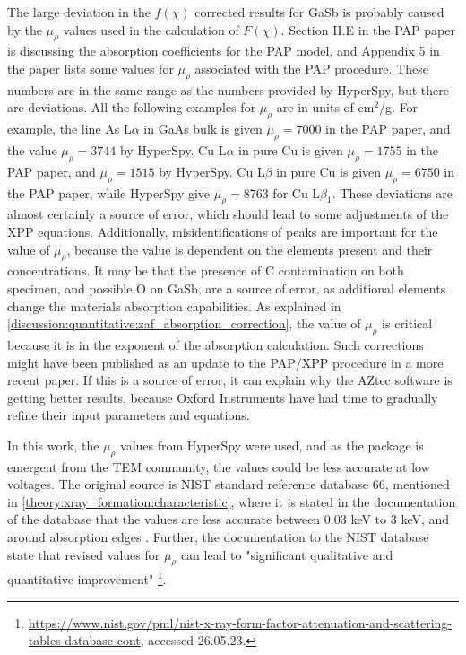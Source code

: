
The large deviation in the $f(\chi)$ corrected results for GaSb is probably caused by the $\mu_\rho$ values used in the calculation of $F(\chi)$.
Section II.E in the PAP paper is discussing the absorption coefficients for the PAP model, and Appendix 5 \cite[p. 63]{pap_1991} in the paper lists some values for $\mu_\rho$ associated with the PAP procedure.
These numbers are in the same range as the numbers provided by HyperSpy, but there are deviations.
All the following examples for $\mu_\rho$ are in units of cm$^2$/g.
For example, the line As L$\alpha$ in GaAs bulk is given $\mu_\rho = 7000$ in the PAP paper, and the value $\mu_\rho = 3744$ by HyperSpy.
Cu L$\alpha$ in pure Cu is given $\mu_\rho = 1755$ in the PAP paper, and $\mu_\rho = 1515$ by HyperSpy.
Cu L$\beta$ in pure Cu is given $\mu_\rho = 6750$ in the PAP paper, while HyperSpy give $\mu_\rho = 8763$ for Cu L$\beta_1$.
These deviations are almost certainly a source of error, which should lead to some adjustments of the XPP equations.
Additionally, misidentifications of peaks are important for the value of  $\mu_\rho$, because the value is dependent on the elements present and their concentrations.
It may be that the presence of C contamination on both specimen, and possible O on GaSb, are a source of error, as additional elements change the materials absorption capabilities.
As explained in \cref{discussion:quantitative:zaf_absorption_correction}, the value of $\mu_\rho$ is critical because it is in the exponent of the absorption calculation.
Such corrections might have been published as an update to the PAP/XPP procedure in a more recent paper.
If this is a source of error, it can explain why the AZtec software is getting better results, because Oxford Instruments have had time to gradually refine their input parameters and equations.


In this work, the $\mu_\rho$ values from HyperSpy were used, and as the package is emergent from the TEM community, the values could be less accurate at low voltages.
The original source is NIST standard reference database 66, mentioned in \cref{theory:xray_formation:characteristic}, where it is stated in the documentation of the database that the values are less accurate between $0.03$ keV to $3$ keV, and around absorption edges \cite{nist_xraydatabase_hyperspy}.
Further, the documentation to the NIST database state that revised values for $\mu_\rho$ can lead to "significant qualitative and quantitative improvement" \cite{nist_xraydatabase_hyperspy}\footnote{\url{https://www.nist.gov/pml/nist-x-ray-form-factor-attenuation-and-scattering-tables-database-cont}, accessed 26.05.23.}.


